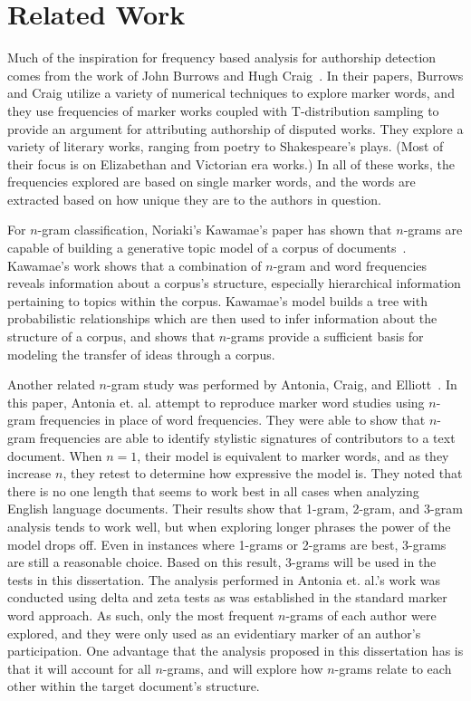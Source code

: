 \documentclass[../dissertation.tex]{subfiles}
\begin{document}
\section{Related Work}
Much of the inspiration for frequency based analysis for authorship
detection comes from the work of John Burrows and Hugh
Craig~\cite{burrows2006, burrows2017, craig2009}.  In their papers,
Burrows and Craig utilize a variety of numerical techniques to explore
marker words, and they use frequencies of marker works coupled with
T-distribution sampling to provide an argument for attributing
authorship of disputed works.  They explore a variety of literary
works, ranging from poetry to Shakespeare's plays.  (Most of their
focus is on Elizabethan and Victorian era works.)  In all of these
works, the frequencies explored are based on single marker words, and
the words are extracted based on how unique they are to the authors in
question.

For $n$-gram classification, Noriaki's Kawamae's paper has shown that
$n$-grams are capable of building a generative topic model of a corpus
of documents~\cite{kawamae2016}.  Kawamae's work shows that a
combination of $n$-gram and word frequencies reveals information about
a corpus's structure, especially hierarchical information pertaining
to topics within the corpus.  Kawamae's model builds a tree with
probabilistic relationships which are then used to infer information
about the structure of a corpus, and shows that $n$-grams provide
a sufficient basis for modeling the transfer of ideas through a corpus.

Another related $n$-gram study was performed by Antonia, Craig, and
Elliott~\cite{antonia2014}.  In this paper, Antonia et. al. attempt to
reproduce marker word studies using $n$-gram frequencies in place of
word frequencies.  They were able to show that $n$-gram frequencies
are able to identify stylistic signatures of contributors to a text
document.  When $n=1$, their model is equivalent to marker words, and
as they increase $n$, they retest to determine how expressive the
model is.  They noted that there is no one length that seems to work
best in all cases when analyzing English language documents.  Their
results show that 1-gram, 2-gram, and 3-gram analysis tends to work
well, but when exploring longer phrases the power of the model drops
off.  Even in instances where 1-grams or 2-grams are best, 3-grams are
still a reasonable choice.  Based on this result, 3-grams will be used
in the tests in this dissertation.  The analysis performed in Antonia
et. al.'s work was conducted using delta and zeta tests as was
established in the standard marker word approach.  As such, only the
most frequent $n$-grams of each author were explored, and they were
only used as an evidentiary marker of an author's participation.  One
advantage that the analysis proposed in this dissertation has is that
it will account for all $n$-grams, and will explore how $n$-grams
relate to each other within the target document's structure.
\end{document}

